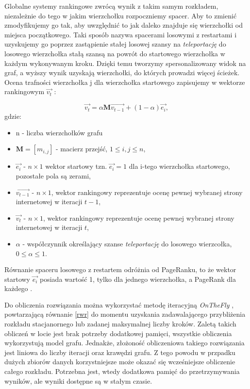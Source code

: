 Globalne systemy rankingowe zwrócą wynik z takim samym rozkładem, niezależnie do tego w jakim wierzchołku rozpoczniemy spacer. Aby to zmienić zmodyfikujemy go tak, aby uwzględnić to jak daleko znajduje się wierzchołki od miejsca początkowego. Taki sposób nazywa spacerami losowymi z restartami i uzyskujemy go poprzez zastąpienie stałej losowej szansy na \textit{teleportację} do losowego wierzchołka stałą szansą na powrót do startowego wierzchołka w każdym wykonywanym kroku. Dzięki temu tworzymy spersonalizowany widok na graf, a wyższy wynik uzyskają wierzchołki, do których prowadzi więcej ścieżek. Ocena trafności wierzchołka j dla wierzchołka startowego zapisujemy w wektorze rankingowym $ \overrightarrow{v_{t}}$ \cite{FastRandomWalkwithRestartandItsApplications}:

\begin{equation}
\label{rwr}
   \overrightarrow{v_{t}} = \alpha \textbf{M}\overrightarrow{v_{t-1}} + (1 - \alpha) \overrightarrow{e_i},
\end{equation}
gdzie:
\begin{itemize}
    \item n - liczba wierzchołków grafu
    \item $\bm{M}=[m_{i,j}] $  - macierz przejść, $1 \leq i, j \leq n$,
    \item $\overrightarrow{e_i}$ - $n \times 1$ wektor startowy tzn. $\overrightarrow{e_{i}}=1$ dla i-tego wierzchołka startowego, pozostałe pola są zerami,
    \item $ \overrightarrow{v_{t-1}}$ - $n \times 1$, wektor rankingowy  reprezentuje ocenę pewnej wybranej strony internetowej w iteracji $t-1$,
    \item $ \overrightarrow{v_{t}}$ - $n \times 1$, wektor rankingowy reprezentuje ocenę pewnej wybranej strony internetowej w iteracji $t$,
    \item $\alpha$ - współczynnik określający szanse \textit{teleportację} do losowego wierzcołka, $0 \leq \alpha \leq 1$.
\end{itemize}



Równanie spaceru losowego z restartem odróżnia od PageRanku, to że wektor startowy $\overrightarrow{e_{i}}$ posiada wartość 1, tylko dla jednego wierzchołka, a PageRank dla każdego \cite{RandomWalkwithRestartanditsapplications}.

Do obliczenia rozwiązania można wykorzystać metodę iteracyjną \textit{OnTheFly} \cite{FastRandomWalkwithRestartandItsApplications}, powtarzającą równanie \ref{rwr} do momentu uzyskania zadawalającego przybliżenia rozkładu stacjanornego lub zadanej maksymalnej liczby kroków. Zaletą takich obliczeń w locie jest brak potrzeby dodatkowej pamięci, wszystkie obliczenia wykorzystują model grafu. Jednakże, złożoność obliczeniowa takiego rozwiązania jest liniowa do liczby iteracji oraz krawędzi grafu. Z tego powodu w przpadku dużych zbiorów danych korzystniejsze może okazać się wcześniejsze obliczenie całego rozkładu. Potrzebna jest, wtedy dodatkowa pamięć do przetrzymywania wyników, ale wyniki dostępne są w stałym czasie.

